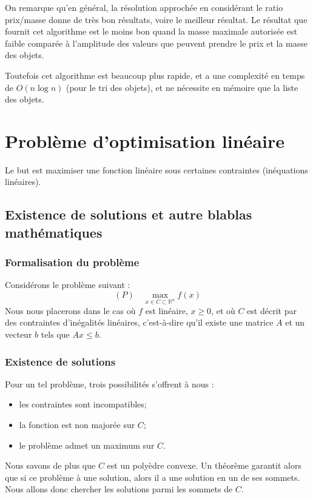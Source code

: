 \documentclass{scrartcl}
\begin{document}
    On remarque qu'en général, la résolution approchée en considérant le ratio
    \nobreak prix/masse donne de très bon résultats, voire le meilleur
    résultat. Le résultat que fournit cet algorithme est le moins bon quand la
    masse maximale autorisée est faible comparée à l'amplitude des valeurs que
    peuvent prendre le prix et la masse des objets.
    
    Toutefois cet algorithme est beaucoup plus rapide, et a une complexité en
    temps de $O(n \log n)$ (pour le tri des objets), et ne nécessite en mémoire
    que la liste des objets.

\section{Problème d'optimisation linéaire} %
  Le but est maximiser une fonction linéaire sous certaines contraintes
  (inéquations linéaires).

  \subsection{Existence de solutions et autre blablas mathématiques}
    \subsubsection{Formalisation du problème}
      Considérons le problème suivant :
      $$ (P) \quad \max_{x\in C \subset \mathbb{R}^n} f(x)$$
      Nous nous placerons dans le cas où $f$ est linéaire, $x \geqslant 0$, 
      et où $C$ est décrit par des contraintes d'inégalités linéaires, 
      c'est-à-dire qu'il existe une matrice $A$ et un vecteur $b$ tels 
      que $Ax\leqslant b$.

    \subsubsection{Existence de solutions}
      Pour un tel problème, trois possibilités s'offrent à nous :
      \begin{itemize}
        \item les contraintes sont incompatibles;
        \item la fonction est non majorée sur $C$;
        \item le problème admet un maximum sur $C$.
      \end{itemize}
      Nous savons de plus que $C$ est un polyèdre convexe. Un théorème garantit
      alors que si ce problème à une solution, alors il a une solution en un de
      ses sommets. Nous allons donc chercher les solutions parmi les sommets de
      $C$.
\end{document}

